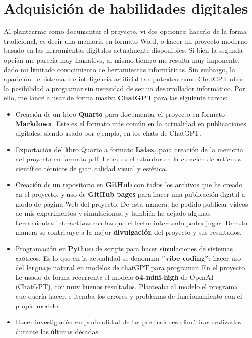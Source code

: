\documentclass[
  11pt,
  a4paper,
  DIV=11,
  numbers=noendperiod]{scrreprt}
\begin{document}
\section{Adquisición de habilidades
digitales}\label{adquisiciuxf3n-de-habilidades-digitales}

Al plantearme como documentar el proyecto, vi dos opciones: hacerlo de
la forma tradicional, es decir una memoria en formato Word, o hacer un
proyecto moderno basado en las herramientas digitales actualmente
disponibles. Si bien la segunda opción me parecía muy llamativa, al
mismo tiempo me resulta muy imponente, dado mi limitado conocimiento de
herramientas informáticas. Sin embargo, la aparición de sistemas de
inteligencia artificial tan potentes como ChatGPT abre la posibilidad a
programar sin necesidad de ser un desarrollador informático. Por ello,
me lancé a usar de forma masiva \textbf{ChatGPT} para las siguiente
tareas:

\begin{itemize}
\item
  Creación de un libro \textbf{Quarto} para documentar el proyecto en
  formato \textbf{Markdown}. Este es el formato más común en la
  actualidad en publicaciones digitales, siendo usado por ejemplo, en
  los chats de ChatGPT.
\item
  Exportación del libro Quarto a formato \textbf{Latex}, para creación
  de la memoria del proyecto en formato pdf. Latex es el estándar en la
  creación de artículos científico técnicos de gran calidad visual y
  estética.
\item
  Creación de un repositorio en \textbf{GitHub} con todos los archivos
  que he creado en el proyecto, y uso de \textbf{GitHub pages} para
  hacer una publicación digital a modo de página Web del proyecto. De
  esta manera, he podido publicar vídeos de mis experimentos y
  simulaciones, y también he dejado algunas herramientas interactivas
  con las que el lector interesado podrá jugar. De esta manera se
  contribuye a la mejor \textbf{divulgación} del proyecto y sus
  resultados.
\item
  Programación en \textbf{Python} de scripts para hacer simulaciones de
  sistemas caóticos. Es lo que en la actualidad se denomina
  \textbf{``vibe coding''}: hacer uso del lenguaje natural en modelos de
  chatGPT para programar. En el proyecto he usado de forma recurrente el
  modelo \textbf{o4-mini-high} de OpenAI (ChatGPT), con muy buenos
  resultados. Planteaba al modelo el programa que quería hacer, e
  iteraba los errores y problemas de funcionamiento con el propio modelo
\item
  Hacer investigación en profundidad de las predicciones climáticas
  realizadas durante las últimas décadas
\end{itemize}
\end{document}
